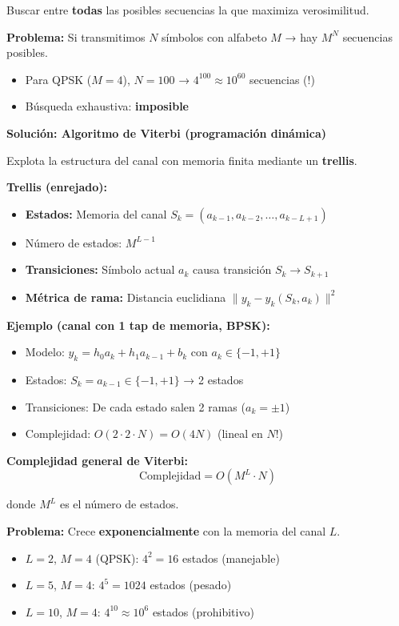 \documentclass[10pt,a4paper]{article}
\begin{document}
Buscar entre \textbf{todas} las posibles secuencias la que maximiza verosimilitud.

\textbf{Problema:} Si transmitimos $N$ símbolos con alfabeto $M$ → hay $M^N$ secuencias posibles.
\begin{itemize}
\item Para QPSK ($M=4$), $N=100$ → $4^{100} \approx 10^{60}$ secuencias (!)
\item Búsqueda exhaustiva: \textbf{imposible}
\end{itemize}

\textbf{Solución: Algoritmo de Viterbi (programación dinámica)}

Explota la estructura del canal con memoria finita mediante un \textbf{trellis}.

\textbf{Trellis (enrejado):}
\begin{itemize}
\item \textbf{Estados:} Memoria del canal $S_k = (a_{k-1}, a_{k-2}, \ldots, a_{k-L+1})$
\item Número de estados: $M^{L-1}$
\item \textbf{Transiciones:} Símbolo actual $a_k$ causa transición $S_k \to S_{k+1}$
\item \textbf{Métrica de rama:} Distancia euclidiana $\|y_k - \hat{y}_k(S_k, a_k)\|^2$
\end{itemize}

\textbf{Ejemplo (canal con 1 tap de memoria, BPSK):}
\begin{itemize}
\item Modelo: $y_k = h_0 a_k + h_1 a_{k-1} + b_k$ con $a_k \in \{-1,+1\}$
\item Estados: $S_k = a_{k-1} \in \{-1, +1\}$ → 2 estados
\item Transiciones: De cada estado salen 2 ramas ($a_k = \pm 1$)
\item Complejidad: $O(2 \cdot 2 \cdot N) = O(4N)$ (lineal en $N$!)
\end{itemize}

\textbf{Complejidad general de Viterbi:}
$$\text{Complejidad} = O(M^L \cdot N)$$

donde $M^L$ es el número de estados.

\textbf{Problema:} Crece \textbf{exponencialmente} con la memoria del canal $L$.
\begin{itemize}
\item $L=2$, $M=4$ (QPSK): $4^2 = 16$ estados (manejable)
\item $L=5$, $M=4$: $4^5 = 1024$ estados (pesado)
\item $L=10$, $M=4$: $4^{10} \approx 10^6$ estados (prohibitivo)
\end{itemize}
\end{document}
